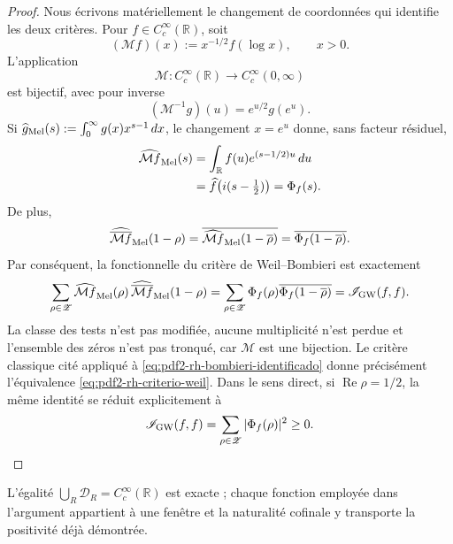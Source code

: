 \begin{proof}
Nous écrivons matériellement le changement de coordonnées qui identifie les deux
critères. Pour \(f\in C_c^\infty(\mathbb R)\), soit
\begin{equation}\label{eq:pdf2-rh-cambio-mellin}
 (\mathcal M f)(x):=x^{-1/2}f(\log x),
 \qquad x>0.
\end{equation}
L’application
\[
 \mathcal M:C_c^\infty(\mathbb R)
 \longrightarrow C_c^\infty(0,\infty)
\]
est bijectif, avec pour inverse
\begin{equation}\label{eq:pdf2-rh-cambio-mellin-inverso}
 (\mathcal M^{-1}g)(u)=e^{u/2}g(e^u).
\end{equation}
Si
\(\widehat g_{\rm Mel}(s):=\int_0^\infty g(x)x^{s-1}\,dx\), le changement
\(x=e^u\) donne, sans facteur résiduel,
\begin{equation}\label{eq:pdf2-rh-mellin-fourier}
 \begin{aligned}
 \widehat{\mathcal M f}_{\rm Mel}(s)
 &=\int_{\mathbb R}f(u)e^{(s-1/2)u}\,du\\
 &=\widehat f\!\left(i(s-\tfrac12)\right)
 =\Phi_f(s).
 \end{aligned}
\end{equation}
De plus,
\begin{equation}\label{eq:pdf2-rh-mellin-involucion}
 \widehat{\overline{\mathcal M f}}_{\rm Mel}(1-\rho)
 =\overline{
   \widehat{\mathcal M f}_{\rm Mel}(1-\overline\rho)}
 =\overline{\Phi_f(1-\overline\rho)}.
\end{equation}
Par conséquent, la fonctionnelle du critère de Weil--Bombieri est exactement
\begin{equation}\label{eq:pdf2-rh-bombieri-identificado}
 \sum_{\rho\in\mathscr Z}
 \widehat{\mathcal M f}_{\rm Mel}(\rho)\,
 \widehat{\overline{\mathcal M f}}_{\rm Mel}(1-\rho)
 =
 \sum_{\rho\in\mathscr Z}
 \Phi_f(\rho)\overline{\Phi_f(1-\overline\rho)}
 =\mathscr I_{\rm GW}(f,f).
\end{equation}
La classe des tests n'est pas modifiée, aucune multiplicité n'est perdue et
l'ensemble des zéros n'est pas tronqué, car \(\mathcal M\) est une bijection. Le
critère classique cité appliqué à
\eqref{eq:pdf2-rh-bombieri-identificado} donne précisément l'équivalence
\eqref{eq:pdf2-rh-criterio-weil}. Dans le sens direct, si
\(\operatorname{Re}\rho=1/2\), la même identité se réduit explicitement à
\[
 \mathscr I_{\rm GW}(f,f)
 =\sum_{\rho\in\mathscr Z}|\Phi_f(\rho)|^2\geq0.
\]
\end{proof}

L'égalité \(\bigcup_R\mathcal D_R=C_c^\infty(\mathbb R)\) est exacte ; chaque
fonction employée dans l'argument appartient à une fenêtre et la naturalité
cofinale y transporte la positivité déjà démontrée.

